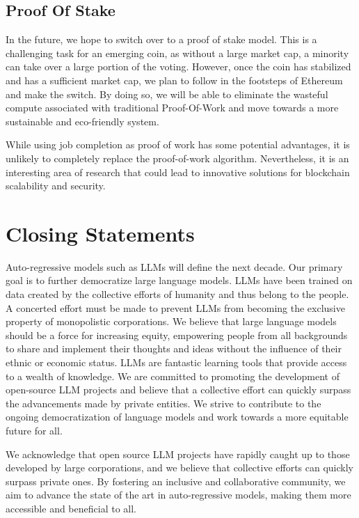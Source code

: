 \documentclass{article}
\begin{document}
\subsection{Proof Of Stake}

In the future, we hope to switch over to a proof of stake model. 
This is a challenging task for an emerging coin, as without a large market cap, a minority can take over a large portion of the voting. 
However, once the coin has stabilized and has a sufficient market cap, we plan to follow in the footsteps of Ethereum and make the switch. 
By doing so, we will be able to eliminate the wasteful compute associated with traditional Proof-Of-Work and move towards a more sustainable and eco-friendly system.

While using job completion as proof of work has some potential advantages, it is unlikely to completely replace the proof-of-work algorithm. Nevertheless, it is an interesting area of research that could lead to innovative solutions for blockchain scalability and security.

\section {Closing Statements}
Auto-regressive models such as LLMs will define the next decade. Our primary goal is to further democratize large language models.
LLMs have been trained on data created by the collective efforts of humanity and thus belong to the people. 
A concerted effort must be made to prevent LLMs from becoming the exclusive property of monopolistic corporations. 
We believe that large language models should be a force for increasing equity, empowering people from all backgrounds to share and implement their thoughts and ideas without the influence of their ethnic or economic status. 
LLMs are fantastic learning tools that provide access to a wealth of knowledge. 
We are committed to promoting the development of open-source LLM projects and believe that a collective effort can quickly surpass the advancements made by private entities. 
We strive to contribute to the ongoing democratization of language models and work towards a more equitable future for all.

We acknowledge that open source LLM projects have rapidly caught up to those developed by large corporations, and we believe that collective efforts can quickly surpass private ones. 
By fostering an inclusive and collaborative community, we aim to advance the state of the art in auto-regressive models, making them more accessible and beneficial to all.
\end{document}
